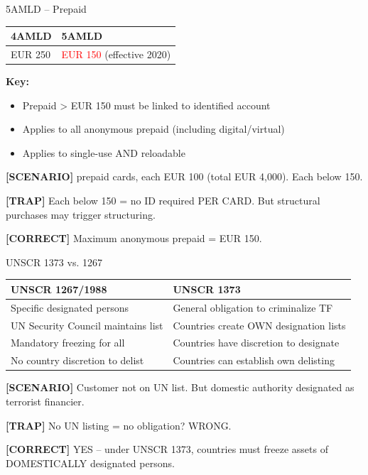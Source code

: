 \documentclass[8pt,aspectratio=169,fontsize=7pt]{beamer}
\renewcommand{\tiny}{\fontsize{4pt}{5pt}\selectfont}
\renewcommand{\normalsize}{\fontsize{8pt}{9pt}\selectfont}
\newcommand{\trap}[1]{%
	\begin{block}{\textcolor{redtrap}{\textbf{[TRAP]}}}
		\textcolor{redtrap}{\tiny #1}
	\end{block}
}
\newcommand{\scenario}[1]{%
	\begin{block}{\textbf{[SCENARIO]}}
		\tiny #1
	\end{block}
}
\newcommand{\correct}[1]{%
	\begin{block}{\textcolor{greencorrect}{\textbf{[CORRECT]}}}
		\textcolor{greencorrect}{\tiny #1}
	\end{block}
}
\begin{document}
	\begin{frame}{\normalsize 5AMLD -- Prepaid}
		
		\begin{table}
			\begin{tabular}{|p{4cm}|p{4cm}|}
				\hline
				\textbf{4AMLD} & \textbf{5AMLD} \\
				\hline
				EUR 250 & \textcolor{red}{EUR 150} (effective 2020) \\
				\hline
			\end{tabular}
		\end{table}
		
		\textbf{Key:}
		\begin{itemize}
			\item Prepaid > EUR 150 must be linked to identified account
			\item Applies to all anonymous prepaid (including digital/virtual)
			\item Applies to single-use AND reloadable
		\end{itemize}
		
		\scenario{40 prepaid cards, each EUR 100 (total EUR 4,000). Each below 150.}
		
		\trap{Each below 150 = no ID required PER CARD. But structural purchases may trigger structuring.}
		
		\correct{Maximum anonymous prepaid = EUR 150.}
	\end{frame}
	
	\begin{frame}{\normalsize UNSCR 1373 vs. 1267}
		
		\begin{table}
			\begin{tabular}{|p{4cm}|p{4cm}|}
				\hline
				\textbf{UNSCR 1267/1988} & \textbf{UNSCR 1373} \\
				\hline
				Specific designated persons & General obligation to criminalize TF \\
				\hline
				UN Security Council maintains list & Countries create OWN designation lists \\
				\hline
				Mandatory freezing for all & Countries have discretion to designate \\
				\hline
				No country discretion to delist & Countries can establish own delisting \\
				\hline
			\end{tabular}
		\end{table}
		
		\scenario{Customer not on UN list. But domestic authority designated as terrorist financier.}
		
		\trap{No UN listing = no obligation? WRONG.}
		
		\correct{YES -- under UNSCR 1373, countries must freeze assets of DOMESTICALLY designated persons.}
	\end{frame}
	
\end{document}
